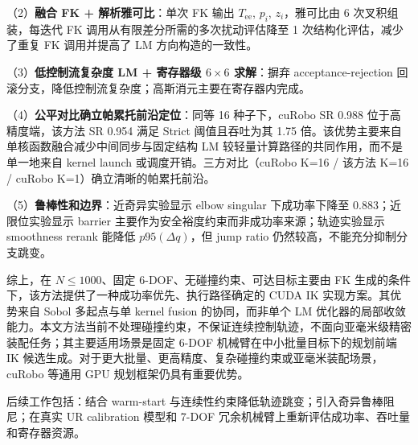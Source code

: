 \documentclass[twocolumn,a4paper,10pt]{ctexart}
\begin{document}
（2）\textbf{融合 FK + 解析雅可比}：单次 FK 输出 $T_{\mathrm{ee}}$, $p_i$, $z_i$，雅可比由 6 次叉积组装，每迭代 FK 调用从有限差分所需的多次扰动评估降至 1 次结构化评估，减少了重复 FK 调用并提高了 LM 方向构造的一致性。

（3）\textbf{低控制流复杂度 LM + 寄存器级 $6\times6$ 求解}：摒弃 acceptance-rejection 回滚分支，降低控制流复杂度；高斯消元主要在寄存器内完成。

（4）\textbf{公平对比确立帕累托前沿定位}：同等 16 种子下，cuRobo SR 0.988 位于高精度端，该方法 SR 0.954 满足 Strict 阈值且吞吐为其 1.75 倍。该优势主要来自单核函数融合减少中间同步与固定结构 LM 较轻量计算路径的共同作用，而不是单一地来自 kernel launch 或调度开销。三方对比（cuRobo K=16 / 该方法 K=16 / cuRobo K=1）确立清晰的帕累托前沿。

（5）\textbf{鲁棒性和边界}：近奇异实验显示 elbow singular 下成功率下降至 0.883；近限位实验显示 barrier 主要作为安全裕度约束而非成功率来源；轨迹实验显示 smoothness rerank 能降低 $p95(\Delta q)$，但 jump ratio 仍然较高，不能充分抑制分支跳变。

综上，在 $N\le1000$、固定 6-DOF、无碰撞约束、可达目标主要由 FK 生成的条件下，该方法提供了一种成功率优先、执行路径确定的 CUDA IK 实现方案。其优势来自 Sobol 多起点与单 kernel fusion 的协同，而非单个 LM 优化器的局部收敛能力。本文方法当前不处理碰撞约束，不保证连续控制轨迹，不面向亚毫米级精密装配任务；其主要适用场景是固定 6-DOF 机械臂在中小批量目标下的规划前端 IK 候选生成。对于更大批量、更高精度、复杂碰撞约束或亚毫米装配场景，cuRobo 等通用 GPU 规划框架仍具有重要优势。

后续工作包括：结合 warm-start 与连续性约束降低轨迹跳变；引入奇异鲁棒阻尼；在真实 UR calibration 模型和 7-DOF 冗余机械臂上重新评估成功率、吞吐量和寄存器资源。
\end{document}
